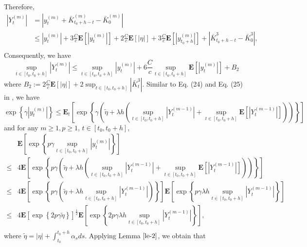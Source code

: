 \documentclass[10pt]{article}%
\numberwithin{equation}{section}
\begin{document}
Therefore,$$
\begin{aligned}
\left|Y^{(m)}_t\right|&=\left|y^{(m)}_t+\bar{K}^{(m)}_{t_0+h-t}-\bar{K}^{(m)}_{0}\right|\\
&\leq \left|y^{(m)}_t\right|+3\frac{C}{c}\mathbf{E}\left[\left|y^{(m)}_t\right|\right]+2\frac{C}{c}\mathbf{E}\left[\left|\eta\right|\right]+3\frac{C}{c}\mathbf{E}\left[\left|y^{(m)}_{t_0+h}\right|\right]+\left|\bar{K}^3_{t_0+h-t}-\bar{K}^3_0\right|,\\
\end{aligned}
$$
Consequently, we have
\begin{equation}\label{supY}
    \sup_{t\in[t_0, t_0+h]}\left|Y^{(m)}_t\right|\leq\sup_{t\in[t_0, t_0+h]}\left|y^{(m)}_t\right|+6\frac{C}{c}\sup_{t\in[t_0, t_0+h]}\mathbf{E}\left[\left|y^{(m)}_t\right|\right]+B_2
\end{equation}
where $B_2:=2\frac{C}{c}\mathbf{E}\left[\left|\eta\right|\right]+2\sup_{t\in[t_0, t_0+h]}\left|\bar{K}^3_t\right|$. Similar to Eq. (24) and Eq. (25) in \cite{HMW},  we have 
$$\exp\left\{\gamma\left|y_{t}^{(m)}\right|\right\}\leq \mathbf{E}_{t}\left[\exp\left\{\gamma\left(\widetilde{\eta}+\lambda h\left(\sup_{t\in[t_0, t_0+h]}\left|Y^{(m-1)}_t\right|+\sup_{t\in[t_0, t_0+h]}\mathbf{E}\left[\left|Y^{(m-1)}_t\right|\right]\right)\right)\right\}\right]$$
and for any $m\geq 1, p\geq 1$, $t\in[t_0,t_0+h]$,
\begin{equation}\label{yineq}
\begin{split}
&\mathbf{E}\left[\exp\left\{p\gamma\sup_{t\in[t_0,t_0+h]}\left|y_{t}^{(m)}\right|\right\}\right]\\
\leq& 4\mathbf{E}\left[\exp\left\{p\gamma\left(\widetilde{\eta} +\lambda h\left(\sup_{t\in[t_0, t_0+h]}\left|Y^{(m-1)}_t\right|+\sup_{t\in[t_0, t_0+h]}\mathbf{E}\left[\left|Y^{(m-1)}_t\right|\right]\right)\right)\right\}\right] \\   
\leq& 4\mathbf{E}\left[\exp\left\{p\gamma\left(\widetilde{\eta}+\lambda h\sup_{t\in[t_0, t_0+h]}\left|Y^{(m-1)}_t\right|\right)\right\}\right]\mathbf{E}\left[\exp\left\{p\gamma\lambda h\sup_{t\in[t_0,t_0+h]}\left|Y^{(m-1)}_t\right|\right\}\right]\\
\leq& 4\mathbf{E}\left[\exp\left\{2p\gamma\widetilde{\eta}\right\}\right]^{\frac{1}{2}}\mathbf{E}\left[\exp\left\{2p \gamma \lambda h \sup_{t\in[t_0,t_0+h]}\left|Y^{(m-1)}_t\right|\right\}\right],\\
\end{split}  
\end{equation}
where $\widetilde{\eta}=|\eta |+\int_{t_0}^{t_0+h} \alpha_s ds $. Applying Lemma $\ref{le-2}$,  we obtain that
\end{document}
